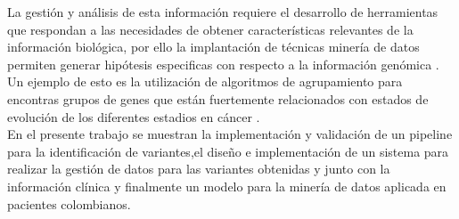 La gestión y análisis de esta información requiere el desarrollo de herramientas que respondan a las necesidades de obtener características relevantes de la información biológica, por ello la implantación de técnicas minería de datos permiten generar hipótesis especificas con respecto a la información genómica \cite{Huttenhower2010}. Un ejemplo de esto es la utilización de algoritmos de agrupamiento para encontras grupos de genes que están fuertemente relacionados con estados de evolución de los diferentes estadios en cáncer \cite{Li2014}.\\

En el presente trabajo se muestran la implementación y validación de un pipeline para la identificación de variantes,el diseño e implementación de un sistema para realizar la gestión de datos para las variantes obtenidas y junto con la información clínica y finalmente un modelo para la  minería de datos aplicada en pacientes colombianos.\\
